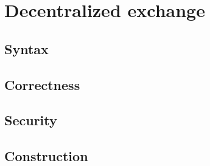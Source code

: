 
\section{Decentralized exchange}

\subsection{Syntax}
\subsection{Correctness}
\subsection{Security}
\subsection{Construction}

\newpage
